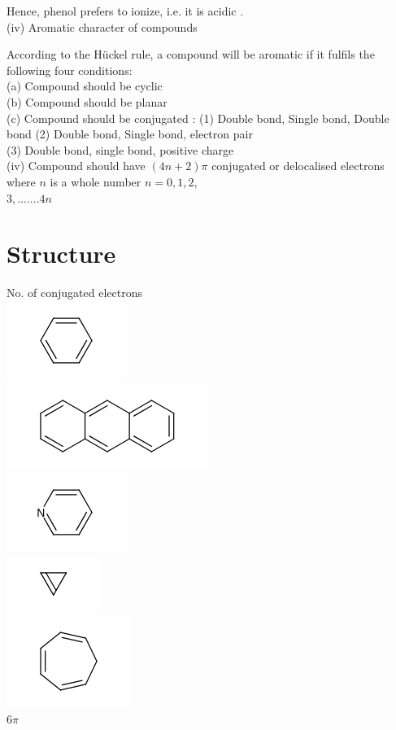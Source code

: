 \documentclass[10pt]{article}
\begin{document}
Hence, phenol prefers to ionize, i.e. it is acidic .\\
(iv) Aromatic character of compounds

According to the Hückel rule, a compound will be aromatic if it fulfils the following four conditions:\\
(a) Compound should be cyclic\\
(b) Compound should be planar\\
(c) Compound should be conjugated : (1) Double bond, Single bond, Double bond (2) Double bond, Single bond, electron pair\\
(3) Double bond, single bond, positive charge\\
(iv) Compound should have $(4 n+2) \pi$ conjugated or delocalised electrons where $n$ is a whole number $n=0,1,2$,\\
$3, \ldots . . . .4 n$

\section*{Structure}
No. of conjugated electrons\\
\includegraphics{smile-f28be541324b3d891950b27a05adc7e20b642e2a}\\
\includegraphics{smile-536471f488c32a3396e178aa4bf9a47f05c48bd8}\\
\includegraphics{smile-dc95ae8fdc758a9db6f55afd4a805ffbe99ad539}\\
\includegraphics{smile-c3a8f9b1f6b0921487af3587af75ba384c5c248f}\\
\includegraphics{smile-60df71783bc491ed2c6af5655bd10707f9e61e56}\\
$6 \pi$
\end{document}
